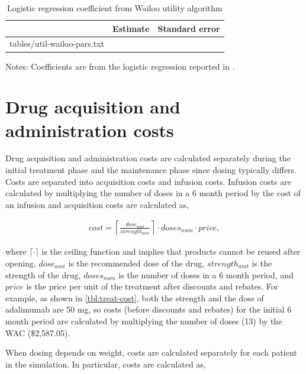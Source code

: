 \documentclass[11pt,final,fleqn]{article}
\makeatletter
\theoremstyle{plain}
\newcommand*\ExpandableInput[1]{\@@input#1 }
\makeatother
\begin{document}
\begin{appendices}
\begin{table}[!ht]
\begin{center}
\begin{threeparttable}
\caption{Logistic regression coefficient from Wailoo utility algorithm} \label{tbl:util-wailoo-coef}
\begin{tabularx}{\textwidth}{@{\extracolsep{\fill}}lcc}
\hline
\multicolumn{1}{c}{} & \multicolumn{1}{c}{Estimate} & \multicolumn{1}{c}{Standard error}  \\
\hline
\ExpandableInput{tables/util-wailoo-pars.txt}
\hline
\end{tabularx}
\scriptsize
Notes: Coefficients are from the logistic regression reported in \citet{wailoo2006modeling}. 
\end{threeparttable}
\end{center}
\end{table}

\section{Drug acquisition and administration costs}\label{app:treat-cost}

Drug acquisition and administration costs are calculated separately during the initial treatment phase and the maintenance phase since dosing typically differs. Costs are separated into acquisition costs and infusion costs. Infusion costs are calculated by multiplying the number of doses in a 6 month period by the cost of an infusion and acquisition costs are calculated as,

\begin{align}
cost = \left\lceil\frac{dose_{amt}}{strength_{amt}}\right\rceil \cdot doses_{num} \cdot price,
\end{align}

where $\lceil\cdot\rceil$ is the ceiling function and implies that products cannot be reused after opening, $dose_{amt}$ is the recommended dose of the drug, $strength_{amt}$ is the strength of the drug, $doses_{num}$ is the number of doses in a 6 month period, and $price$ is the price per unit of the treatment after discounts and rebates. For example, as shown in \autoref{tbl:treat-cost}, both the strength and the dose of adalimumab are 50 mg, so costs (before discounts and rebates) for the initial 6 month period are calculated by multiplying the number of doses (13) by the WAC (\$2,587.05).

When dosing depends on weight, costs are calculated separately for each patient in the simulation. In particular, costs are calculated as,


\end{appendices}
\end{document}
